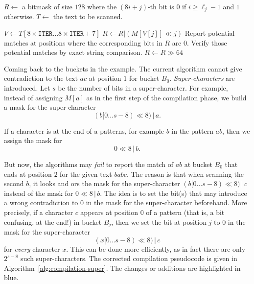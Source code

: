 \begin{algorithm}[H]
  \caption{Execution phase of the FDR string matcher}
  \label{alg:execution}
  \begin{algorithmic}[1]
    \State $R\gets$ a bitmask of size $128$ where the $(8i+j)$-th bit is $0$ if $i\ge \ell_j-1$ and $1$ otherwise.
    \State $T\gets$ the text to be scanned.

    \State $V\gets T[8\times\texttt{ITER}\ldots 8\times\texttt{ITER}+7]$
    \State $R\gets R | (M[V[j]] \ll j)$
    \EndFor
    \State Report potential matches at positions where the corresponding bits in $R$ are $0$. Verify those potential matches by exact string comparison.
    \State $R\gets R \gg 64$
    \EndFor
  \end{algorithmic}
\end{algorithm}

Coming back to the buckets in the example. The current algorithm cannot give contradiction to the text $ac$ at position $1$ for bucket $B_0$. \textit{Super-characters} are introduced. Let $s$ be the number of bits in a super-character. For example, instead of assigning $M[a]$ as in the first step of the compilation phase, we build a mask for the super-character
$$(b[0\ldots s-8)\ll 8) \,|\, a.$$

If a character is at the end of a patterns, for example $b$ in the pattern $ab$, then we assign the mask for
$$0\ll 8 \,|\, b.$$

But now, the algorithms may \textit{fail} to report the match of $ab$ at bucket $B_0$ that ends at position $2$ for the given text $babc$. The reason is that when scanning the second $b$, it looks and ors the mask for the super-character $(b[0\ldots s-8)\ll 8) \,|\, c$ instead of the mask for $0\ll 8 \,|\, b$. The idea is to set the bit(s) that may introduce a wrong contradiction to $0$ in the mask for the super-character beforehand. More precisely, if a character $c$ appears at position $0$ of a pattern (that is, a bit confusing, at the end!) in bucket $B_j$, then we set the bit at position $j$ to $0$ in the mask for the super-character
$$(x[0\ldots s-8)\ll 8) \,|\, c$$
for \textit{every} character $x$. This can be done more efficiently, as in fact there are only $2^{s-8}$ such super-characters. The corrected compilation pseudocode is given in Algorithm~\ref{alg:compilation-super}. The changes or additions are highlighted in \textcolor{gustave}{blue}.

